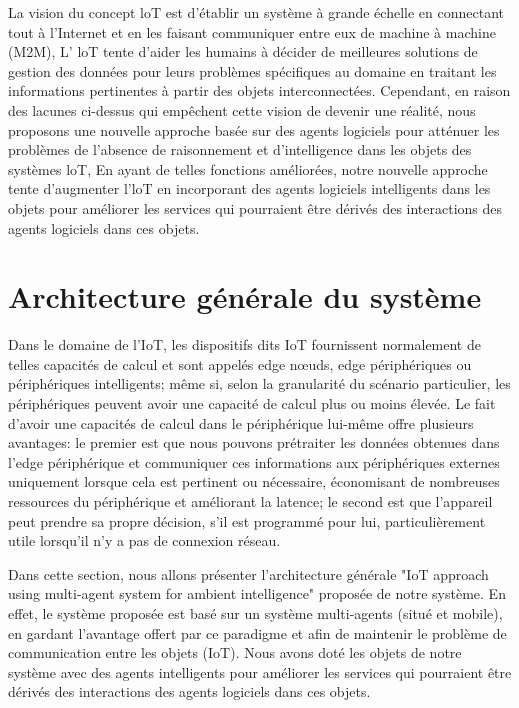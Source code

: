 La vision du concept loT est d'établir un système à grande échelle en connectant tout à l'Internet et en les faisant communiquer entre eux de machine à machine (M2M), L' loT tente d'aider les humains à décider de meilleures solutions de gestion des données pour leurs problèmes spécifiques au domaine en traitant les informations pertinentes à partir des objets interconnectées. Cependant, en raison des lacunes ci-dessus qui empêchent cette vision de devenir une réalité, nous proposons une nouvelle approche basée sur des agents logiciels pour atténuer les problèmes de l’absence de raisonnement et d'intelligence dans les objets des systèmes loT, En ayant de telles fonctions améliorées, notre nouvelle approche tente d'augmenter l'loT en incorporant des agents logiciels intelligents dans les objets pour améliorer les services qui pourraient être dérivés des interactions des agents logiciels dans ces objets.


\section{Architecture générale du système}

 Dans le domaine de l'IoT, les dispositifs dits IoT fournissent normalement de telles capacités de calcul et sont appelés edge nœuds, edge périphériques ou périphériques intelligents; même si, selon la granularité du scénario particulier, les périphériques peuvent avoir une capacité de calcul plus ou moins élevée. Le fait d'avoir une capacités de calcul dans le périphérique lui-même offre plusieurs avantages: le premier est que nous pouvons prétraiter les données obtenues dans l'edge périphérique et communiquer ces informations aux périphériques externes uniquement lorsque cela est pertinent ou nécessaire, économisant de nombreuses ressources du périphérique et améliorant la latence; le second est que l'appareil peut prendre sa propre décision, s'il est programmé pour lui, particulièrement utile lorsqu'il n'y a pas de connexion réseau.
 
Dans cette section, nous allons présenter l’architecture générale "IoT approach using multi-agent system for ambient intelligence" \cite{zouai2017iot} proposée de notre système. En effet, le système proposée est basé sur un système multi-agents (situé et mobile), en gardant l’avantage offert par ce paradigme et afin de maintenir le problème de communication entre les objets (IoT). Nous avons doté les objets de notre système avec des agents intelligents pour améliorer les services qui pourraient être dérivés des interactions des agents logiciels dans ces objets.

